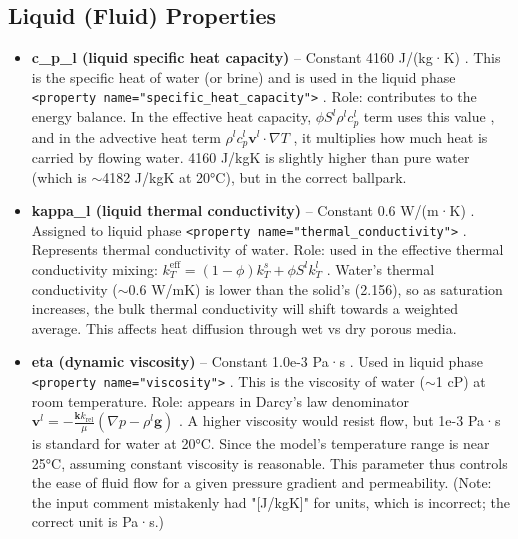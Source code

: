 \documentclass[10pt,a4paper]{article}
\begin{document}
\subsection*{Liquid (Fluid) Properties}
\begin{itemize}
    \item \textbf{c\_p\_l (liquid specific heat capacity)} – Constant 4160 J/(kg·K) \cite{file:03_parameters_TRM}. This is the specific heat of water (or brine) and is used in the liquid phase \texttt{<property name="specific\_heat\_capacity">} \cite{file:04_1_media_aqu_liq}. Role: contributes to the energy balance. In the effective heat capacity, $\phi S^l \rho^l c_p^l$ term uses this value \cite{ogs:trm}, and in the advective heat term $\rho^l c_p^l \mathbf{v}^l \cdot \nabla T$ \cite{ogs:trm}, it multiplies how much heat is carried by flowing water. 4160 J/kgK is slightly higher than pure water (which is $\sim$4182 J/kgK at 20°C), but in the correct ballpark.

    \item \textbf{kappa\_l (liquid thermal conductivity)} – Constant 0.6 W/(m·K) \cite{file:03_parameters_TRM}. Assigned to liquid phase \texttt{<property name="thermal\_conductivity">} \cite{file:04_1_media_aqu_liq}. Represents thermal conductivity of water. Role: used in the effective thermal conductivity mixing: $k_T^{\text{eff}} = (1-\phi)k_T^s + \phi S^l k_T^l$ \cite{ogs:trm}. Water's thermal conductivity ($\sim$0.6 W/mK) is lower than the solid's (2.156), so as saturation increases, the bulk thermal conductivity will shift towards a weighted average. This affects heat diffusion through wet vs dry porous media.

    \item \textbf{eta (dynamic viscosity)} – Constant 1.0e-3 Pa·s \cite{file:03_parameters_TRM}. Used in liquid phase \texttt{<property name="viscosity">} \cite{file:04_1_media_aqu_liq}. This is the viscosity of water ($\sim$1 cP) at room temperature. Role: appears in Darcy's law denominator $\mathbf{v}^l = -\frac{\mathbf{k} k_{\text{rel}}}{\mu}(\nabla p - \rho^l \mathbf{g})$ \cite{ogs:trm}. A higher viscosity would resist flow, but 1e-3 Pa·s is standard for water at 20°C. Since the model's temperature range is near 25°C, assuming constant viscosity is reasonable. This parameter thus controls the ease of fluid flow for a given pressure gradient and permeability. (Note: the input comment mistakenly had "[J/kgK]" for units, which is incorrect; the correct unit is Pa·s.)


\end{itemize}
\end{document}
